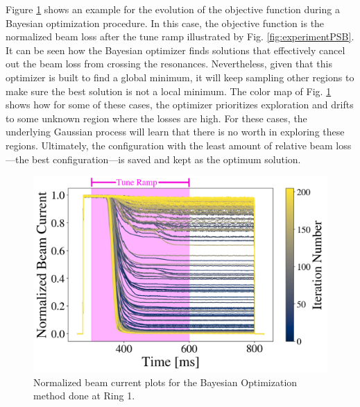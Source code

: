 Figure \ref{fig:ibo} shows an example for the evolution of the objective function during a Bayesian optimization procedure. In this case, the objective function is the normalized beam loss after the tune ramp illustrated by Fig. \ref{fig:experimentPSB}. It can be seen how the Bayesian optimizer finds solutions that effectively cancel out the beam loss from crossing the resonances. Nevertheless, given that this optimizer is built to find a global minimum, it will keep sampling other regions to make sure the best solution is not a local minimum. The color map of Fig. \ref{fig:ibo} shows how for some of these cases, the optimizer prioritizes exploration and drifts to some unknown region where the losses are high. For these cases, the underlying Gaussian process will learn that there is no worth in exploring these regions. Ultimately, the configuration with the least amount of relative beam loss---the best configuration---is saved and kept as the optimum solution.

\begin{figure}[H]
    \centering
    \includegraphics[width=\linewidth]{chapter5/i1_bo_commented.png}
    \caption{Normalized beam current plots for the Bayesian Optimization method done at Ring 1.}
    \label{fig:ibo}
\end{figure}

